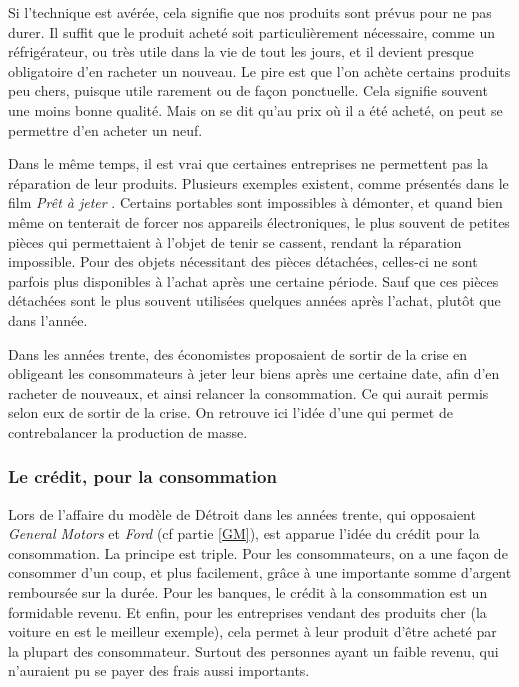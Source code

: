 Si l'\op technique est avérée, cela signifie que nos produits sont prévus pour ne pas durer. Il suffit que le produit acheté soit particulièrement nécessaire, comme un réfrigérateur, ou très utile dans la vie de tout les jours, et il devient presque obligatoire d'en racheter un nouveau. Le pire est que l'on achète certains produits peu chers, puisque utile rarement ou de façon ponctuelle. Cela signifie souvent une moins bonne qualité. Mais on se dit qu'au prix où il a été acheté, on peut se permettre d'en acheter un neuf.

Dans le même temps, il est vrai que certaines entreprises ne permettent pas la réparation de leur produits. Plusieurs exemples existent, comme présentés dans le film \textit{Prêt à jeter} \cite{PretAjeter}. Certains portables sont impossibles à démonter, et quand bien même on tenterait de forcer nos appareils électroniques, le plus souvent de petites pièces qui permettaient à l'objet de tenir se cassent, rendant la réparation impossible. Pour des objets nécessitant des pièces détachées, celles-ci ne sont parfois plus disponibles à l'achat après une certaine période. Sauf que ces pièces détachées sont le plus souvent utilisées quelques années après l'achat, plutôt que dans l'année.

\bigbreak
Dans les années trente, des économistes proposaient de sortir de la crise en obligeant les consommateurs à jeter leur biens après une certaine date, afin d'en racheter de nouveaux, et ainsi relancer la consommation. Ce qui aurait permis selon eux de sortir de la crise. On retrouve ici l'idée d'une \op qui permet de contrebalancer la production de masse. 


\subsubsection{Le crédit, pour la consommation}
Lors de l'affaire du modèle de Détroit dans les années trente, qui opposaient \textit{General Motors} et \textit{Ford} (cf partie \ref{GM}), est apparue l'idée du crédit pour la consommation. La principe est triple. Pour les consommateurs, on a une façon de consommer d'un coup, et plus facilement, grâce à une importante somme d'argent remboursée sur la durée. Pour les banques, le crédit à la consommation est un formidable revenu. Et enfin, pour les entreprises vendant des produits cher (la voiture en est le meilleur exemple), cela permet à leur produit d'être acheté par la plupart des consommateur. Surtout des personnes ayant un faible revenu, qui n'auraient pu se payer des frais aussi importants.

